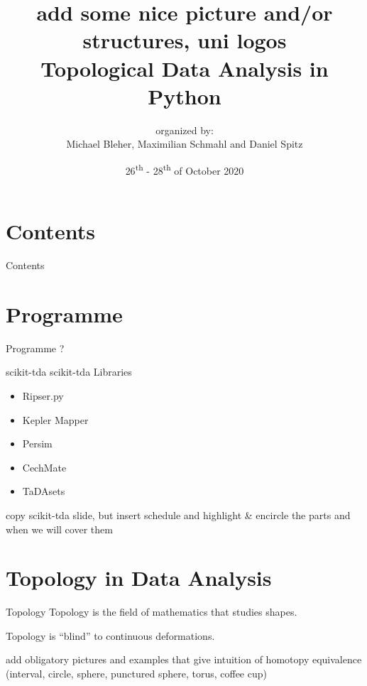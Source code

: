 \documentclass{beamer}
\title{
\tiny{add some nice picture and/or structures, uni logos} \\
\vspace{0.3cm}
\Large{Topological Data Analysis in Python}}
\date{26\textsuperscript{th} - 28\textsuperscript{th} of October 2020}
\author[Michael Bleher]{organized by: \\  Michael Bleher, Maximilian Schmahl and Daniel Spitz}
\institute{Heidelberg University}
\begin{document}
\titlepage




\section*{Contents}
\begin{frame}[plain]{Contents}
\setcounter{tocdepth}{1}
\tableofcontents
\end{frame}




\section{Programme}

\begin{frame}{Programme}
?
\end{frame}


\begin{frame}{scikit-tda}
scikit-tda Libraries
\begin{itemize}
	\item Ripser.py
  \item Kepler Mapper
  \item Persim
  \item CechMate
  \item TaDAsets
\end{itemize}
\end{frame}


\begin{frame}
copy scikit-tda slide, but insert schedule and highlight \& encircle the parts and when we will cover them
\end{frame}




\section{Topology in Data Analysis}

\begin{frame}{Topology}
Topology is the field of mathematics that studies shapes.

Topology is ``blind'' to continuous deformations.

add obligatory pictures and examples that give intuition of homotopy equivalence (interval, circle, sphere, punctured sphere, torus, coffee cup)
\end{frame}
\end{document}
